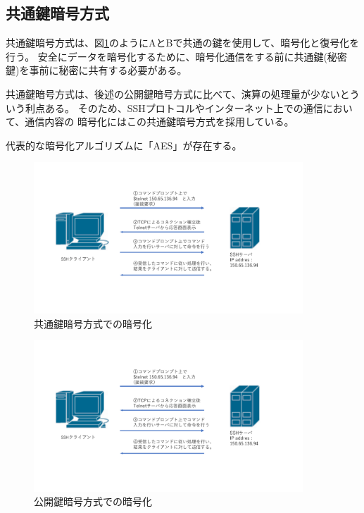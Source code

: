 \documentclass[11pt,a4j,titlepage]{jreport}
\begin{document}
\subsection{共通鍵暗号方式}
共通鍵暗号方式は、図\ref{shared_key}のようにAとBで共通の鍵を使用して、暗号化と復号化を行う。
安全にデータを暗号化するために、暗号化通信をする前に共通鍵(秘密鍵)を事前に秘密に共有する必要がある。

共通鍵暗号方式は、後述の公開鍵暗号方式に比べて、演算の処理量が少ないとういう利点ある。
そのため、SSHプロトコルやインターネット上での通信において、通信内容の
暗号化にはこの共通鍵暗号方式を採用している。

代表的な暗号化アルゴリズムに「AES」が存在する。

\afterpage{\clearpage}
\newpage

\begin{figure}[tbp]
    \centering
    \includegraphics[width=0.9\textwidth, page=8]{graphs/network_archtecture.pdf}
    \caption{共通鍵暗号方式での暗号化}
    \label{shared_key}
\end{figure}

\begin{figure}[tbp]
    \centering
    \includegraphics[width=0.9\textwidth, page=9]{graphs/network_archtecture.pdf}
    \caption{公開鍵暗号方式での暗号化}
    \label{public_key}
\end{figure}
\end{document}
